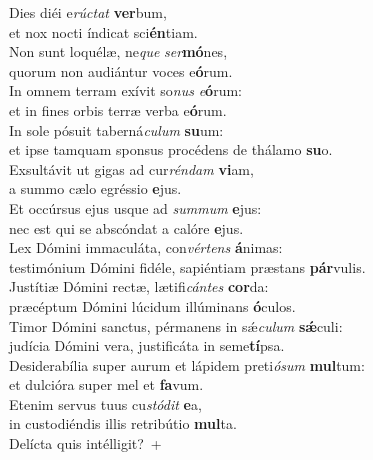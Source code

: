 \evenverse Dies diéi e\textit{rú}\textit{ctat} \textbf{ver}bum,~\*\\
\evenverse et nox nocti índicat sci\textbf{én}tiam.\\
\oddverse Non sunt loquélæ, ne\textit{que} \textit{ser}\textbf{mó}nes,~\*\\
\oddverse quorum non audiántur voces e\textbf{ó}rum.\\
\evenverse In omnem terram exívit so\textit{nus} \textit{e}\textbf{ó}rum:~\*\\
\evenverse et in fines orbis terræ verba e\textbf{ó}rum.\\
\oddverse In sole pósuit taberná\textit{cu}\textit{lum} \textbf{su}um:~\*\\
\oddverse et ipse tamquam sponsus procédens de thálamo \textbf{su}o.\\
\evenverse Exsultávit ut gigas ad cur\textit{rén}\textit{dam} \textbf{vi}am,~\*\\
\evenverse a summo cælo egréssio \textbf{e}jus.\\
\oddverse Et occúrsus ejus usque ad \textit{sum}\textit{mum} \textbf{e}jus:~\*\\
\oddverse nec est qui se abscóndat a calóre \textbf{e}jus.\\
\evenverse Lex Dómini immaculáta, con\textit{vér}\textit{tens} \textbf{á}nimas:~\*\\
\evenverse testimónium Dómini fidéle, sapiéntiam præstans \textbf{pár}vulis.\\
\oddverse Justítiæ Dómini rectæ, lætifi\textit{cán}\textit{tes} \textbf{cor}da:~\*\\
\oddverse præcéptum Dómini lúcidum illúminans \textbf{ó}culos.\\
\evenverse Timor Dómini sanctus, pérmanens in sǽ\textit{cu}\textit{lum} \textbf{sǽ}culi:~\*\\
\evenverse judícia Dómini vera, justificáta in seme\textbf{tí}psa.\\
\oddverse Desiderabília super aurum et lápidem preti\textit{ó}\textit{sum} \textbf{mul}tum:~\*\\
\oddverse et dulcióra super mel et \textbf{fa}vum.\\
\evenverse Etenim servus tuus cu\textit{stó}\textit{dit} \textbf{e}a,~\*\\
\evenverse in custodiéndis illis retribútio \textbf{mul}ta.\\
\oddverse Delícta quis intélligit?~+\\

